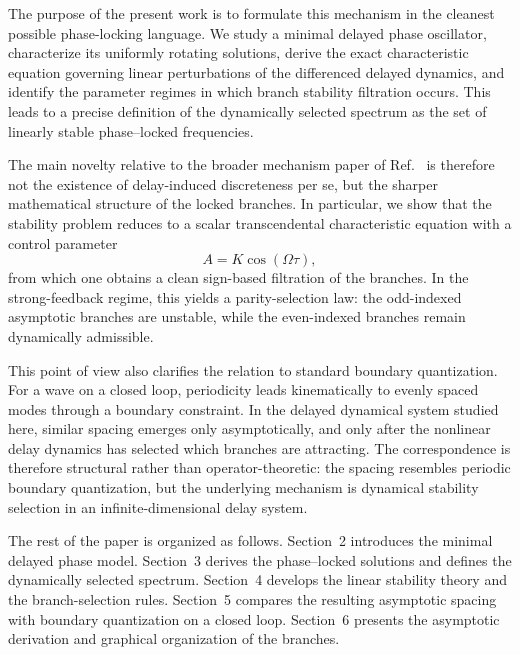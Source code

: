 \documentclass[11pt,a4paper]{article}
\begin{document}
        The purpose of the present work is to formulate this mechanism in the cleanest possible phase-locking language. We study a minimal delayed phase oscillator, characterize its uniformly rotating solutions, derive the exact characteristic equation governing linear perturbations of the differenced delayed dynamics, and identify the parameter regimes in which branch stability filtration occurs. This leads to a precise definition of the dynamically selected spectrum as the set of linearly stable phase--locked frequencies.
        
        The main novelty relative to the broader mechanism paper of Ref.~\cite{Iskandarani2026DelayModeSelection} is therefore not the existence of delay-induced discreteness per se, but the sharper mathematical structure of the locked branches. In particular, we show that the stability problem reduces to a scalar transcendental characteristic equation with a control parameter
        \begin{equation}
            A = K\cos(\Omega\tau),
        \end{equation}
        from which one obtains a clean sign-based filtration of the branches. In the strong-feedback regime, this yields a parity-selection law: the odd-indexed asymptotic branches are unstable, while the even-indexed branches remain dynamically admissible.
        
        This point of view also clarifies the relation to standard boundary quantization. For a wave on a closed loop, periodicity leads kinematically to evenly spaced modes through a boundary constraint. In the delayed dynamical system studied here, similar spacing emerges only asymptotically, and only after the nonlinear delay dynamics has selected which branches are attracting. The correspondence is therefore structural rather than operator-theoretic: the spacing resembles periodic boundary quantization, but the underlying mechanism is dynamical stability selection in an infinite-dimensional delay system.
        
        The rest of the paper is organized as follows. Section~2 introduces the minimal delayed phase model. Section~3 derives the phase--locked solutions and defines the dynamically selected spectrum. Section~4 develops the linear stability theory and the branch-selection rules. Section~5 compares the resulting asymptotic spacing with boundary quantization on a closed loop. Section~6 presents the asymptotic derivation and graphical organization of the branches.
\end{document}
